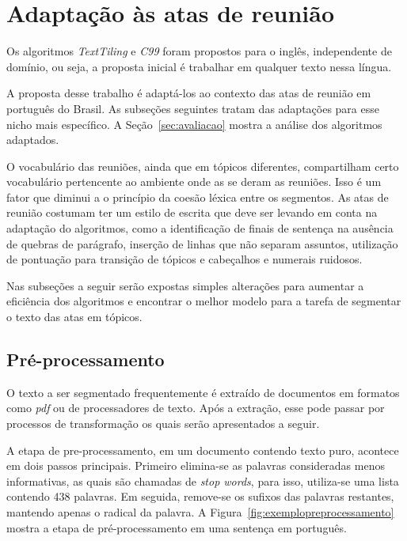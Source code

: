 \section{Adaptação às atas de reunião}
	\label{sec:adaptacaoasatas}



Os algoritmos \textit{TextTiling} e \textit{C99} foram propostos para o inglês, independente de domínio, ou seja, a proposta inicial é trabalhar em qualquer texto nessa língua.

A proposta desse trabalho é adaptá-los ao contexto das atas de reunião em português do Brasil. As subseções seguintes tratam das adaptações para esse nicho mais específico. A Seção~\ref{sec:avaliacao} mostra a análise dos algoritmos adaptados.

O vocabulário das reuniões, ainda que em tópicos diferentes, compartilham certo vocabulário pertencente ao ambiente onde as se deram as reuniões. Isso é um fator que diminui a o princípio da coesão léxica entre os segmentos.
As atas de reunião costumam ter um estilo de escrita que deve ser levando em conta na adaptação do algoritmos, como a identificação de finais de sentença na ausência de quebras de parágrafo, inserção de linhas que não separam assuntos, utilização de pontuação para transição de tópicos e cabeçalhos e numerais ruidosos. 

Nas subseções a seguir serão expostas simples alterações para aumentar a eficiência dos algoritmos e encontrar o melhor modelo para a tarefa de segmentar o texto das atas em tópicos.


\subsection{Pré-processamento}
	\label{subsec:preprocessamento}




	O texto a ser segmentado frequentemente é extraído de documentos em formatos como \textit{pdf} ou de processadores de texto. Após a extração, esse pode passar por processos de transformação os quais serão apresentados a seguir.

	A etapa de pre-processamento, em um documento contendo texto puro, acontece em dois passos principais. Primeiro elimina-se as palavras consideradas menos informativas, as quais são chamadas de \textit{stop words}, para isso, utiliza-se uma lista contendo 438 palavras. Em seguida, remove-se os sufixos das palavras restantes, mantendo apenas o radical da palavra. A Figura~\ref{fig:exemplopreprocessamento} mostra a etapa de pré-processamento em uma sentença em português.
	



